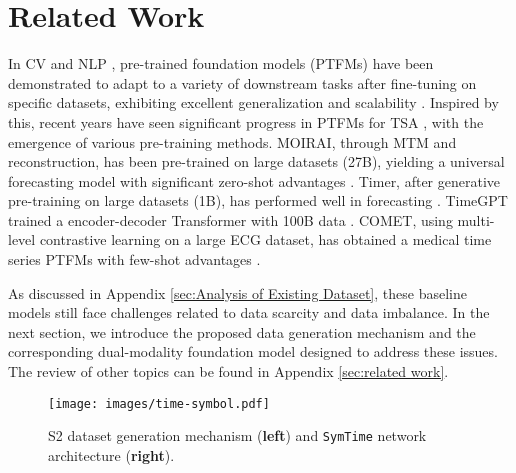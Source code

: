 \section{Related Work}
In CV and NLP \cite{CLIP}, pre-trained foundation models (PTFMs) have been demonstrated to adapt to a variety of downstream tasks after fine-tuning on specific datasets, exhibiting excellent generalization and scalability \cite{TimeMIL}. Inspired by this, recent years have seen significant progress in PTFMs for TSA \cite{Transformer-in-TSA, KDD-Survey}, with the emergence of various pre-training methods. MOIRAI, through MTM and reconstruction, has been pre-trained on large datasets (27B), yielding a universal forecasting model with significant zero-shot advantages \cite{MOIRAI}. Timer, after generative pre-training on large datasets (1B), has performed well in forecasting \cite{Timer}. TimeGPT trained a encoder-decoder Transformer with 100B data \cite{TimeGPT}. COMET, using multi-level contrastive learning on a large ECG dataset, has obtained a medical time series PTFMs with few-shot advantages \cite{COMET}. 

As discussed in Appendix \ref{sec:Analysis of Existing Dataset}, these baseline models still face challenges related to data scarcity and data imbalance. In the next section, we introduce the proposed data generation mechanism and the corresponding dual-modality foundation model designed to address these issues. The review of other topics can be found in Appendix \ref{sec:related work}.

\begin{figure*}[!t]
\centerline{\texttt{[image: images/time-symbol.pdf]}}
\vskip -0.05in
\caption{S2 dataset generation mechanism (\textbf{left}) and \texttt{SymTime} network architecture (\textbf{right}).}
\label{figure:symtime}
\end{figure*}